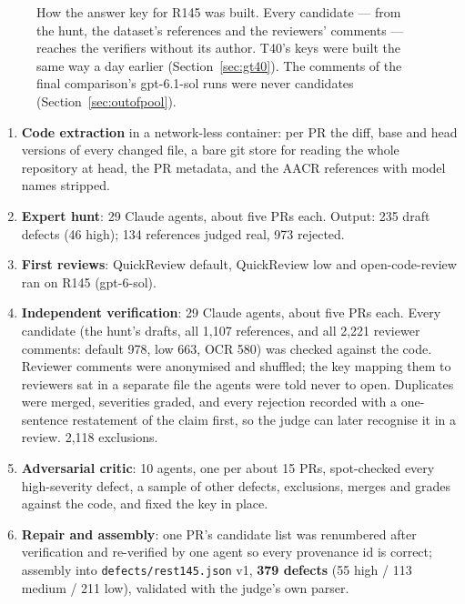 \documentclass[11pt,a4paper]{article}
\newcommand{\qcr}{QuickReview}
\newcommand{\code}[1]{\texttt{#1}}
\begin{document}
\begin{figure}[tbp]
{}
\caption{How the answer key for R145 was built. Every candidate
--- from the hunt, the dataset's references and the reviewers' comments ---
reaches the verifiers without its author. T40's keys were built
the same way a day earlier (Section~\ref{sec:gt40}). The comments of the
final comparison's gpt-6.1-sol runs were never candidates
(Section~\ref{sec:outofpool}).}
\label{fig:gtpipeline}
\end{figure}

\begin{enumerate}
  \item \textbf{Code extraction} in a network-less container: per PR the
  diff, base and head versions of every changed file, a bare git store for
  reading the whole repository at head, the PR metadata, and the AACR
  references with model names stripped.
  \item \textbf{Expert hunt}: 29 Claude agents, about five PRs each.
  Output: 235 draft defects (46 high); 134 references judged real, 973
  rejected.
  \item \textbf{First reviews}: \qcr{} default, \qcr{} low and
  open-code-review ran on R145 (gpt-6-sol).
  \item \textbf{Independent verification}: 29 Claude agents, about five PRs
  each. Every candidate (the hunt's drafts, all 1{,}107 references, and all
  2{,}221 reviewer comments: default 978, low 663, OCR 580) was checked
  against the code. Reviewer comments were anonymised and shuffled; the key
  mapping them to reviewers sat in a separate file the agents were told never
  to open. Duplicates were merged, severities graded, and every rejection
  recorded with a one-sentence restatement of the claim first, so the judge
  can later recognise it in a review. 2{,}118 exclusions.
  \item \textbf{Adversarial critic}: 10 agents, one per about 15 PRs,
  spot-checked every high-severity defect, a sample of other defects,
  exclusions, merges and grades against the code, and fixed the key in
  place.
  \item \textbf{Repair and assembly}: one PR's candidate list was renumbered
  after verification and re-verified by one agent so every provenance id is
  correct; assembly into \code{defects/rest145.json} v1, \textbf{379 defects}
  (55 high / 113 medium / 211 low), validated with the judge's own parser.
\end{enumerate}
\end{document}
